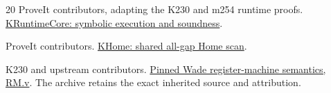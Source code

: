 \documentclass[11pt,letterpaper]{article}
\theoremstyle{definition}
\newcommand{\baseurl}{https://github.com/VladimirReshetnikov/ProveIt/blob/cbf94cb552a3b49509e0eee80e7455d4eb5974c6/}
\begin{document}
\begin{thebibliography}{20}
 ProveIt contributors, adapting the K230 and m254 runtime proofs.
\href{\baseurl Computability/BusyBeaver/Lean/BusyBeaver/ZFC/KRuntimeCore.lean}{KRuntimeCore: symbolic execution and soundness}.

 ProveIt contributors.
\href{\baseurl Computability/BusyBeaver/Lean/BusyBeaver/ZFC/KHome.lean}{KHome: shared all-gap Home scan}.

 K230 and upstream contributors.
\href{\baseurl Computability/BusyBeaver/Research/ZFC/k225-formal/verification/k215/simplification/proposals/zfc215-simplification/source_proof/deps/K230/RM.v}{Pinned Wade register-machine semantics, RM.v}.
The archive retains the exact inherited source and attribution.
\end{thebibliography}
\end{document}
